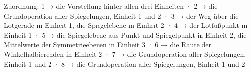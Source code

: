 
Zuordnung: 1 → die Vorstellung hinter allen drei Einheiten · 2 → die Grundoperation aller Spiegelungen, Einheit 1 und 2 · 3 → der Weg über die Lotgerade in Einheit 1, die Spiegelebene in Einheit 2 · 4 → der Lotfußpunkt in Einheit 1 · 5 → die Spiegelebene aus Punkt und Spiegelpunkt in Einheit 2, die Mittelwerte der Symmetrieebenen in Einheit 3 · 6 → die Raute der Winkelhalbierenden in Einheit 2 · 7 → die Grundoperation aller Spiegelungen, Einheit 1 und 2 · 8 → die Grundoperation aller Spiegelungen, Einheit 1 und 2

